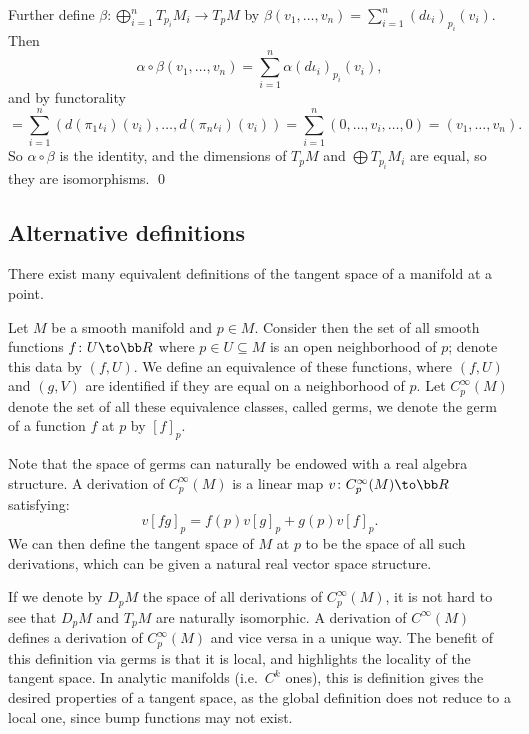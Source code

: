     Further define $\beta\colon\bigoplus_{i=1}^nT_{p_i}M_i\to T_pM$ by $\beta(v_1,\dots,v_n)=\sum_{i=1}^n(d\iota_i)_{p_i}(v_i)$.
    Then
    $$ \alpha\circ\beta(v_1,\dots,v_n) = \sum_{i=1}^n\alpha(d\iota_i)_{p_i}(v_i) , $$
    and by functorality
    $$ = \sum_{i=1}^n(d(\pi_1\iota_i)(v_i),\dots,d(\pi_n\iota_i)(v_i)) = \sum_{i=1}^n (0,\dots,v_i,\dots,0) = (v_1,\dots,v_n) . $$
    So $\alpha\circ\beta$ is the identity, and the dimensions of $T_pM$ and $\bigoplus T_{p_i}M_i$ are equal, so they are isomorphisms.
    \qed

\eproof

\subsection{Alternative definitions}

There exist many equivalent definitions of the tangent space of a manifold at a point.

\bdefn

    Let $M$ be a smooth manifold and $p\in M$.
    Consider then the set of all smooth functions $f\colon U\to\bR$ where $p\in U\subseteq M$ is an open neighborhood of $p$; denote this data
    by $(f,U)$.
    We define an equivalence of these functions, where $(f,U)$ and $(g,V)$ are identified if they are equal on a neighborhood of $p$.
    Let $C_p^\infty(M)$ denote the set of all these equivalence classes, called {\emphcolor germs}, we denote the germ of a function $f$ at $p$ by $[f]_p$.

    Note that the space of germs can naturally be endowed with a real algebra structure.
    A {\emphcolor derivation} of $C^\infty_p(M)$ is a linear map $v\colon C^\infty_p(M)\to\bR$ satisfying:
    $$ v[fg]_p = f(p)v[g]_p + g(p)v[f]_p . $$
    We can then define the tangent space of $M$ at $p$ to be the space of all such derivations, which can be given a natural real vector space
    structure.

\edefn

If we denote by $D_pM$ the space of all derivations of $C^\infty_p(M)$, it is not hard to see that $D_pM$ and $T_pM$ are naturally isomorphic.
A derivation of $C^\infty(M)$ defines a derivation of $C^\infty_p(M)$ and vice versa in a unique way.
The benefit of this definition via germs is that it is local, and highlights the locality of the tangent space.
In analytic manifolds (i.e.\ $C^k$ ones), this is definition gives the desired properties of a tangent space, as the global definition does not
reduce to a local one, since bump functions may not exist.

